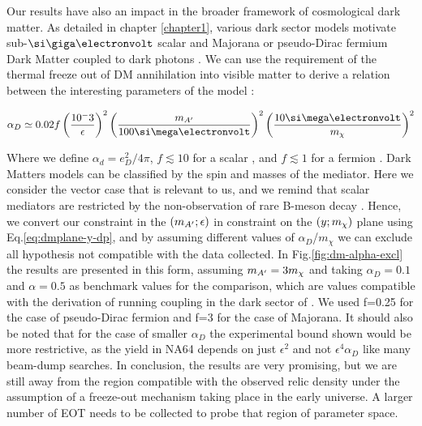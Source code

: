 Our results have also an impact in the broader framework of cosmological dark matter. As detailed in chapter \ref{chapter1}, various dark sector models motivate sub-$\gev$ scalar and Majorana or pseudo-Dirac fermium Dark Matter coupled to dark photons \cite{battaglieri2017cosmic}. We can use the requirement of the thermal freeze out of DM annihilation into visible matter to derive a relation between the interesting parameters of the model \cite{na64-prd}:

\begin{equation}
  \label{eq:ad-freeze-out}
  \alpha_D \simeq 0.02 f\left(\frac{10^-3}{\epsilon}\right)^2\left(\frac{m_{\DM}}{100 \mev}\right)^2\left(\frac{10 \mev}{m_{\chi}}\right)^2
\end{equation}

Where we define $\alpha_d = e^2_D/4\pi$, $f\lesssim 10$ for a scalar \cite{deNiverville:2011it}, and $f\lesssim 1$ for a fermion \cite{PhysRevD.91.094026}. Dark Matters models can be classified by the spin and masses of the mediator. Here we consider the vector case that is relevant to us, and we remind that scalar mediators are restricted by the non-observation of rare B-meson decay \cite{battaglieri2017cosmic}. Hence, we convert our constraint in the $(m_{A'};\epsilon)$ in constraint on the $(y;m_{\chi})$ plane using Eq.\ref{eq:dmplane-y-dp}, and by assuming different values of $\alpha_D$/$m_{\chi}$ we can exclude all hypothesis not compatible with the data collected. In Fig.\ref{fig:dm-alpha-excl} the results are presented in this form, assuming $m_{A'} = 3m_{\chi}$ and taking $\alpha_D=0.1$ and $\alpha=0.5$ as benchmark values for the comparison, which are values compatible with the derivation of running coupling in the dark sector of \cite{Davoudiasl:2015hxa}. We used f=0.25 for the case of pseudo-Dirac fermion and f=3 for the case of Majorana. It should also be noted that for the case of smaller $\alpha_D$ the experimental bound shown would be more restrictive, as the yield in NA64 depends on just $\epsilon^2$ and not $\epsilon^4 \alpha_D$ like many beam-dump searches. In conclusion, the results are very promising, but we are still away from the region compatible with the observed relic density under the assumption of a freeze-out mechanism taking place in the early universe. A larger number of EOT needs to be collected to probe that region of parameter space.

